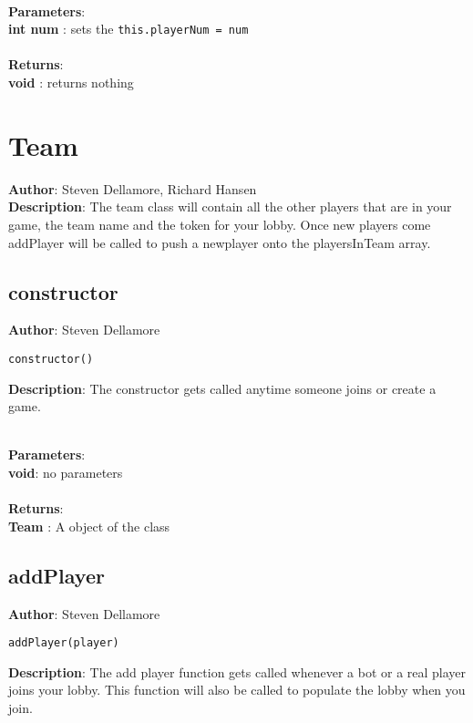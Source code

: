 \documentclass[12pt]{article}
\begin{document}
\textbf{\large{\\Parameters}}:\\
\textbf{int num }: sets the \texttt{this.playerNum = num}\\\textbf{\large{\\Returns}}:\\
\textbf{void }: returns nothing\\

\section{Team}
\textbf{Author}: Steven Dellamore, Richard Hansen \\
\textbf{Description}: The team class will contain all the other players that are in your game, the team name and the token for your lobby. Once new players come addPlayer will be called to push a newplayer onto the playersInTeam array. \\



\subsection{constructor}
\textbf{Author}: Steven Dellamore 
\vspace*{1\baselineskip}
\begin{lstlisting}
constructor()
\end{lstlisting} 
\vspace*{1\baselineskip}
\textbf{Description}: The constructor gets called anytime someone joins or create a game. 


\textbf{\large{\\Parameters}}:\\
\textbf{void}: no parameters\\\textbf{\large{\\Returns}}:\\
\textbf{Team }: A object of the class\\

\subsection{addPlayer}
\textbf{Author}: Steven Dellamore 
\vspace*{1\baselineskip}
\begin{lstlisting}
addPlayer(player)
\end{lstlisting} 
\vspace*{1\baselineskip}
\textbf{Description}: The add player function gets called whenever a bot or a real player joins your lobby. This function will also be called to populate the lobby when you join. 
\end{document}
